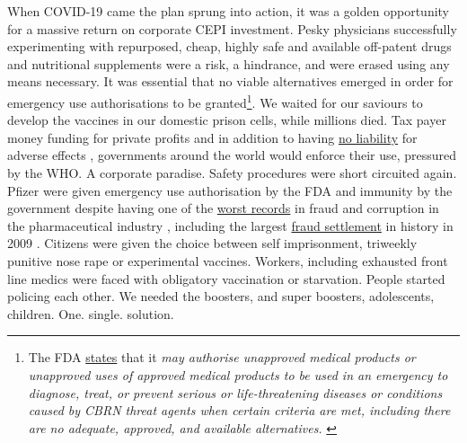 \documentclass[11pt,a4paper,notitlepage]{report}
\begin{document}
When COVID-19 came the plan sprung into action, it was a golden opportunity for a massive return on corporate CEPI investment. Pesky physicians successfully experimenting with repurposed, cheap, highly safe and available off-patent drugs and nutritional supplements were a risk, a hindrance, and were erased using any means necessary. It was essential that no viable alternatives emerged in order for emergency use authorisations to be granted\footnote{The FDA \href{https://www.fda.gov/emergency-preparedness-and-response/mcm-legal-regulatory-and-policy-framework/emergency-use-authorization}{states} that it \textit{may authorise unapproved medical products or unapproved uses of approved medical products to be used in an emergency to diagnose, treat, or prevent serious or life-threatening diseases or conditions caused by CBRN threat agents when certain criteria are met, including there are no adequate, approved, and available alternatives.} \cite{fda-eua}}. We waited for our saviours to develop the vaccines in our domestic prison cells, while millions died. Tax payer money funding for private profits and in addition to having \href{https://www.cnbc.com/2020/12/16/covid-vaccine-side-effects-compensation-lawsuit.html}{no liability} for adverse effects \cite{cnbc17122020}, governments around the world would enforce their use, pressured by the WHO. A corporate paradise. Safety procedures were short circuited again. Pfizer were given emergency use authorisation by the FDA and immunity by the government despite having one of the \href{https://www.ncbi.nlm.nih.gov/pmc/articles/PMC2875889/}{worst records} in fraud and corruption in the pharmaceutical industry \cite{evans052010}, including the largest \href{https://www.justice.gov/opa/pr/justice-department-announces-largest-health-care-fraud-settlement-its-history}{fraud settlement} in history in 2009 \cite{pfizer-fraud-settlement}. Citizens were given the choice between self imprisonment, triweekly punitive nose rape or experimental vaccines. Workers, including exhausted front line medics were faced with obligatory vaccination or starvation. People started policing each other. We needed the boosters, and super boosters, adolescents, children. One. single. solution.
\end{document}
